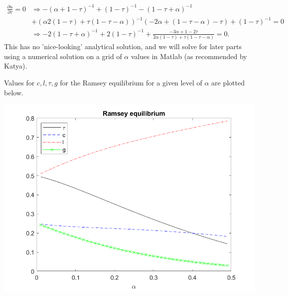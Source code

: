 \documentclass[11pt]{article} %
\begin{document}
\begin{align*}
\frac{\partial u}{\partial \tau} = 0 &\Rightarrow -(\alpha +1-\tau)^{-1} + (1-\tau)^{-1} - (1-\tau+\alpha)^{-1} \\&+ (\alpha 2(1-\tau) + \tau (1-\tau - \alpha))^{-1}(-2\alpha + (1-\tau-\alpha)-\tau) +(1-\tau)^{-1} =0\\
&\Rightarrow -2(1-\tau+\alpha)^{-1} + 2(1-\tau)^{-1} +\frac{-3\alpha + 1 - 2\tau}{2\alpha(1-\tau) + \tau(1-\tau-\alpha)} = 0.
\end{align*}
This has no 'nice-looking' analytical solution, and we will solve for later parts using a numerical solution on a grid of $\alpha$ values in Matlab (as recommended by Katya).

Values for $c,l,\tau,g$ for the Ramsey equilibrium for a given level of $\alpha$ are plotted below.

\includegraphics{ramsey}

\end{document}
